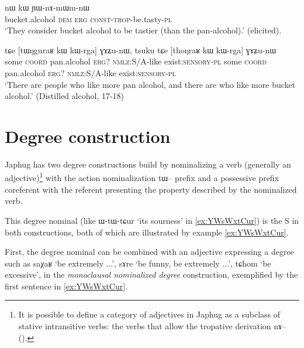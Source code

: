 \documentclass[oldfontcommands,oneside,a4paper,11pt]{article}
\newcommand{\ipa}[1]{{\phon #1}} %
\begin{document}
\begin{exe}
\ex \label{ex:nAmWm}
\gll  \ipa{thoŋraʁ} 	\ipa{nɯ} 	\ipa{kɯ} 	\ipa{ɲɯ-nɤ-mɯm-nɯ} \\
 bucket.alcohol \textsc{dem} \textsc{erg}  \textsc{const-trop}-be.tasty-\textsc{pl} \\
 \glt `They consider  bucket alcohol to be tastier (than the pan-alcohol).'  (elicited).
\end{exe}

\begin{exe}
\ex \label{ex:kWrga}
\gll \ipa{tsuku}   	\ipa{tɕe}   	 [\ipa{tɯŋguraʁ}   	\ipa{kɯ}   	\ipa{kɯ-rga}]   	\ipa{ɣɤʑu-nɯ,}   		\ipa{tsuku}   	\ipa{tɕe}   	[\ipa{thoŋraʁ}   	\ipa{kɯ}   	\ipa{kɯ-rga}]   	\ipa{ɣɤʑu-nɯ}   \\
some \textsc{coord} pan.alcohol \textsc{erg?} \textsc{nmlz:S/A}-like exist\textsc{:sensory}-\textsc{pl} some \textsc{coord} pan.alcohol \textsc{erg?} \textsc{nmlz:S/A}-like exist\textsc{:sensory}-\textsc{pl} \\
\glt `There are people who like more pan alcohol, and there are who like more bucket alcohol.' (Distilled alcohol, 17-18)
\end{exe}


%
 
\section{Degree construction} \label{sec:degree}
 
 
Japhug has two degree constructions build by nominalizing a verb (generally an adjective)\footnote{It is possible to define a category of adjectives in Japhug as a subclass of stative intransitive verbs: the verbs that allow the tropative derivation \ipa{nɤ--} (\citealt{jacques13tropative}).}  with the action nominalization \ipa{tɯ--} prefix and a possessive prefix coreferent with the referent presenting the property described by the nominalized verb. 

This degree nominal (like \ipa{ɯ-tɯ-tɕur} `its sourness' in \ref{ex:YWsWxtCur}) is the S in both constructions,  both of which are illustrated by example \ref{ex:YWsWxtCur}. 

First, the degree nominal can be  combined with an adjective expressing a degree such as \ipa{saχaʁ} `be extremely ...', \ipa{sɤre} `be funny, be extremely ...', \ipa{tɕhom} `be excessive', in the \textit{monoclausal nominalized degree} construction, exemplified by the first sentence in \ref{ex:YWsWxtCur}.
\end{document}
